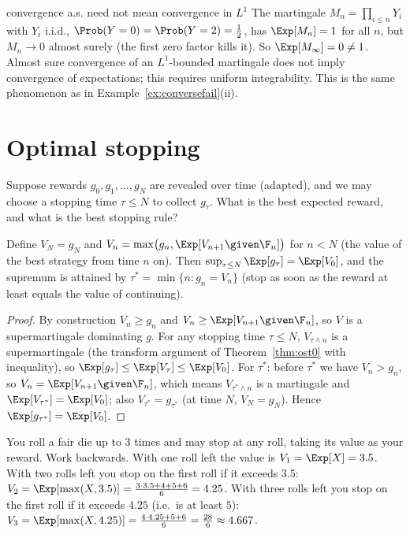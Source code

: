 \begin{nuance}{convergence a.s. need not mean convergence in $L^1$}
The martingale $M_n=\prod_{i\le n}Y_i$ with $Y_i$ i.i.d., $\Prob(Y=0)=\Prob(Y=2)=\tfrac12$,
has $\Exp[M_n]=1$ for all $n$, but $M_n\to0$ almost surely (the first zero factor kills it).
So $\Exp[M_\infty]=0\ne1$. Almost sure convergence of an $L^1$-bounded martingale does not
imply convergence of expectations; this requires uniform integrability. This is the same
phenomenon as in Example~\ref{ex:conversefail}(ii).
\end{nuance}

\section{Optimal stopping}

Suppose rewards $g_0,g_1,\dots,g_N$ are revealed over time (adapted), and we may choose a
stopping time $\tau\le N$ to collect $g_\tau$. What is the best expected reward, and what
is the best stopping rule?

\begin{theorem}\label{thm:snell}
Define $V_N=g_N$ and $V_n=\max\bigl(g_n,\Exp[V_{n+1}\given\F_n]\bigr)$ for $n<N$ (the value
of the best strategy from time $n$ on). Then $\sup_{\tau\le N}\Exp[g_\tau]=\Exp[V_0]$, and the
supremum is attained by $\tau^*=\min\{n:g_n=V_n\}$ (stop as soon as the reward at least
equals the value of continuing).
\end{theorem}
\begin{proof}
By construction $V_n\ge g_n$ and $V_n\ge\Exp[V_{n+1}\given\F_n]$, so $V$ is a supermartingale
dominating $g$. For any stopping time $\tau\le N$, $V_{\tau\wedge n}$ is a supermartingale
(the transform argument of Theorem~\ref{thm:ost0} with inequality), so
$\Exp[g_\tau]\le\Exp[V_\tau]\le\Exp[V_0]$. For $\tau^*$: before $\tau^*$ we have
$V_n>g_n$, so $V_n=\Exp[V_{n+1}\given\F_n]$, which means $V_{\tau^*\wedge n}$ is a martingale
and $\Exp[V_{\tau^*}]=\Exp[V_0]$; also $V_{\tau^*}=g_{\tau^*}$ (at time $N$, $V_N=g_N$).
Hence $\Exp[g_{\tau^*}]=\Exp[V_0]$.
\end{proof}

\begin{example}\label{ex:diceopt}
You roll a fair die up to $3$ times and may stop at any roll, taking its value as your
reward. Work backwards. With one roll left the value is $V_1=\Exp[X]=3.5$. With two rolls
left you stop on the first roll if it exceeds $3.5$:
$V_2=\Exp[\max(X,3.5)]=\frac{3\cdot3.5+4+5+6}6=4.25$. With three rolls left you stop on the
first roll if it exceeds $4.25$ (i.e.\ is at least $5$):
$V_3=\Exp[\max(X,4.25)]=\frac{4\cdot4.25+5+6}6=\frac{28}6\approx4.667$.
\end{example}

